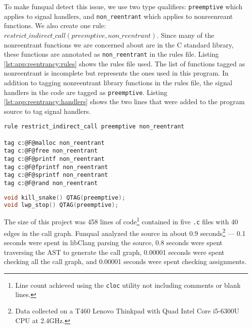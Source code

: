 To make funqual detect this issue, we use two type qualifiers: \lstinline{preemptive} which applies to signal handlers, and \lstinline{non_reentrant} which applies to nonreenreant functions.  We also create one rule: $restrict\_indirect\_call(preemptive, non\_reentrant)$.  Since many of the nonreentrant functions we are concerned about are in the C standard library, these functions are annotated as \lstinline{non_reentrant} in the rules file.  Listing \ref{lst:app:reentrancy:rules} shows the rules file used.  The list of functions tagged as nonreentrant is incomplete but represents the ones used in this program.  In addition to tagging nonreentrant library functions in the rules file, the signal handlers in the code are tagged as \lstinline{preemptive}.  Listing \ref{lst:app:reentrancy:handlers} shows the two lines that were added to the program source to tag signal handlers.  

\noindent\begin{minipage}[t]{\linewidth}
\begin{lstlisting}[caption={Rules file for preventing preemptive functions from calling non\_reentrant functions.  Since this rules file contains no references to project-specific functions, the file could concievably be re-used by several projects.},label={lst:app:reentrancy:rules}]
rule restrict_indirect_call preemptive non_reentrant

tag c:@F@malloc non_reentrant
tag c:@F@free non_reentrant
tag c:@F@printf non_reentrant
tag c:@F@fprintf non_reentrant
tag c:@F@sprintf non_reentrant
tag c:@F@rand non_reentrant
\end{lstlisting}
\end{minipage}

\noindent\begin{minipage}[t]{\linewidth}
\begin{lstlisting}[language=c,caption={Lines inserted into C file to mark signal handlers as preemptive.},label={lst:app:reentrancy:handlers}]
void kill_snake() QTAG(preemptive);
void lwp_stop() QTAG(preemptive);
\end{lstlisting}
\end{minipage}

The size of this project was 458 lines of code\footnote{Line count achieved using the \lstinline{cloc} utility not including comments or blank lines.} contained in five \lstinline{.c} files with 40 edges in the call graph.  Funqual analyzed the source in about 0.9 seconds\footnote{Data collected on a T460 Lenovo Thinkpad with Quad Intel Core i5-6300U CPU at 2.4GHz.} --- 0.1 seconds were spent in libClang parsing the source, 0.8 seconds were spent traversing the AST to generate the call graph, 0.00001 seconds were spent checking all the call graph, and 0.00001 seconds were spent checking assignments. 

